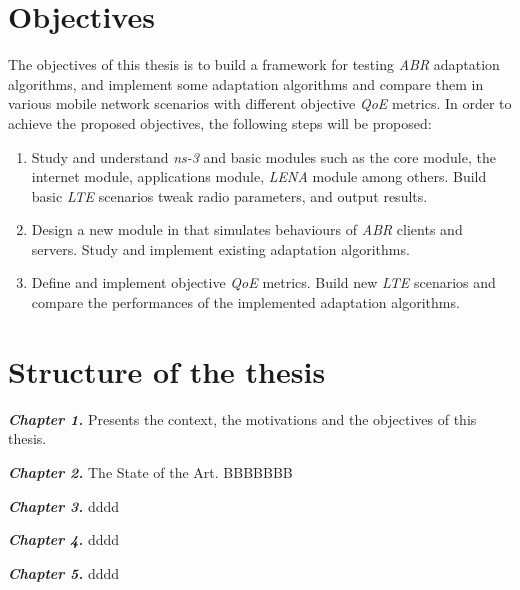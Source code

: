 \section{Objectives}
\label{sec:objectives}
The objectives of this thesis is to build a framework for testing \textit{ABR} adaptation
algorithms, and implement some adaptation algorithms and compare them in 
various mobile network scenarios with different objective \textit{QoE} metrics. 
In order to achieve the proposed objectives, the following steps will be proposed:

\begin{enumerate}
  \item Study and understand \textit{ns-3} and basic modules such as the core module, the
  internet module, applications module, \textit{LENA} module among others. Build basic \textit{LTE} scenarios
  tweak radio parameters, and output results.
  \item Design a new module in  that simulates behaviours of \textit{ABR} clients
  and servers. Study and implement existing adaptation algorithms.
  \item Define and implement objective \textit{QoE} metrics.
  Build new \textit{LTE} scenarios and compare the performances of the implemented adaptation
  algorithms.
\end{enumerate}


\section{Structure of the thesis}
\label{sec:structure}


\textbf{\textit{Chapter 1.}} Presents the context, the motivations and the objectives of this thesis.

\textbf{\textit{Chapter 2.}} The State of the Art. BBBBBBB

\textbf{\textit{Chapter 3.}} dddd

\textbf{\textit{Chapter 4.}} dddd

\textbf{\textit{Chapter 5.}} dddd
